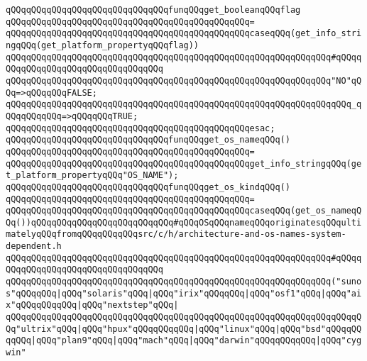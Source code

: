 \newline
\verb|qQQqqQQqqQQqqQQqqQQqqQQqqQQqqQQqfunqQQqget_booleanqQQqflag|\newline
\verb|qQQqqQQqqQQqqQQqqQQqqQQqqQQqqQQqqQQqqQQqqQQqqQQq=|\newline
\verb|qQQqqQQqqQQqqQQqqQQqqQQqqQQqqQQqqQQqqQQqqQQqqQQqcaseqQQq(get_info_stringqQQq(get_platform_propertyqQQqflag))|\newline
\verb|qQQqqQQqqQQqqQQqqQQqqQQqqQQqqQQqqQQqqQQqqQQqqQQqqQQqqQQqqQQqqQQq#qQQqqQQqqQQqqQQqqQQqqQQqqQQqqQQqqQQq|\newline
\verb|qQQqqQQqqQQqqQQqqQQqqQQqqQQqqQQqqQQqqQQqqQQqqQQqqQQqqQQqqQQqqQQq"NO"qQQq=>qQQqqQQqFALSE;|\newline
\verb|qQQqqQQqqQQqqQQqqQQqqQQqqQQqqQQqqQQqqQQqqQQqqQQqqQQqqQQqqQQqqQQqqQQq_qQQqqQQqqQQq=>qQQqqQQqTRUE;|\newline
\verb|qQQqqQQqqQQqqQQqqQQqqQQqqQQqqQQqqQQqqQQqqQQqqQQqesac;|\newline
\newline
\verb|qQQqqQQqqQQqqQQqqQQqqQQqqQQqqQQqfunqQQqget_os_nameqQQq()|\newline
\verb|qQQqqQQqqQQqqQQqqQQqqQQqqQQqqQQqqQQqqQQqqQQqqQQq=|\newline
\verb|qQQqqQQqqQQqqQQqqQQqqQQqqQQqqQQqqQQqqQQqqQQqqQQqget_info_stringqQQq(get_platform_propertyqQQq"OS_NAME");|\newline
\newline
\verb|qQQqqQQqqQQqqQQqqQQqqQQqqQQqqQQqfunqQQqget_os_kindqQQq()|\newline
\verb|qQQqqQQqqQQqqQQqqQQqqQQqqQQqqQQqqQQqqQQqqQQqqQQq=|\newline
\verb|qQQqqQQqqQQqqQQqqQQqqQQqqQQqqQQqqQQqqQQqqQQqqQQqcaseqQQq(get_os_nameqQQq())qQQqqQQqqQQqqQQqqQQqqQQqqQQq#qQQqOSqQQqnameqQQqoriginatesqQQqultimatelyqQQqfromqQQqqQQqqQQqsrc/c/h/architecture-and-os-names-system-dependent.h|\newline
\verb|qQQqqQQqqQQqqQQqqQQqqQQqqQQqqQQqqQQqqQQqqQQqqQQqqQQqqQQqqQQqqQQq#qQQqqQQqqQQqqQQqqQQqqQQqqQQqqQQqqQQq|\newline
\verb|qQQqqQQqqQQqqQQqqQQqqQQqqQQqqQQqqQQqqQQqqQQqqQQqqQQqqQQqqQQqqQQq("sunos"qQQqqQQq|\verb#|qQQq"solaris"qQQq|qQQq"irix"qQQqqQQq|qQQq"osf1"qQQq|qQQq"aix"qQQqqQQqqQQq|qQQq"nextstep"qQQq|#\newline
\verb|qQQqqQQqqQQqqQQqqQQqqQQqqQQqqQQqqQQqqQQqqQQqqQQqqQQqqQQqqQQqqQQqqQQqqQQq"ultrix"qQQq|\verb#|qQQq"hpux"qQQqqQQqqQQq|qQQq"linux"qQQq|qQQq"bsd"qQQqqQQqqQQq|qQQq"plan9"qQQq|qQQq"mach"qQQq|qQQq"darwin"qQQqqQQqqQQq|qQQq"cygwin"#\newline
